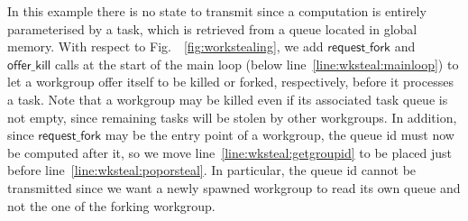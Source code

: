 \documentclass[parskip=half,sigconf,review, anonymous=true, acmcopyrightmode=none]{acmart}
\newcommand{\myfig}{Fig.~}
\newcommand{\offerfork}{\mathsf{request\_fork}}
\newcommand{\offerkill}{\mathsf{offer\_kill}}
\begin{document}
%
In this example there is no state to transmit since a computation is
entirely parameterised by a task, which is retrieved from a queue
located in global memory. With respect to \myfig~\ref{fig:workstealing},
we add $\offerfork$ and $\offerkill$ calls at the start of the main loop
(below line~\ref{line:wksteal:mainloop}) to let a workgroup offer itself
to be killed or forked, respectively, before it processes a task.  Note
that a workgroup may be killed even if its associated task queue is not
empty, since remaining tasks will be stolen by other workgroups. In
addition, since $\offerfork$ may be the entry point of a workgroup, the
queue id must now be computed after it, so we move
line~\ref{line:wksteal:getgroupid} to be placed just before
line~\ref{line:wksteal:poporsteal}. In particular, the queue id cannot
be transmitted since we want a newly spawned workgroup to read its own
queue and not the one of the forking workgroup.

\end{document}
